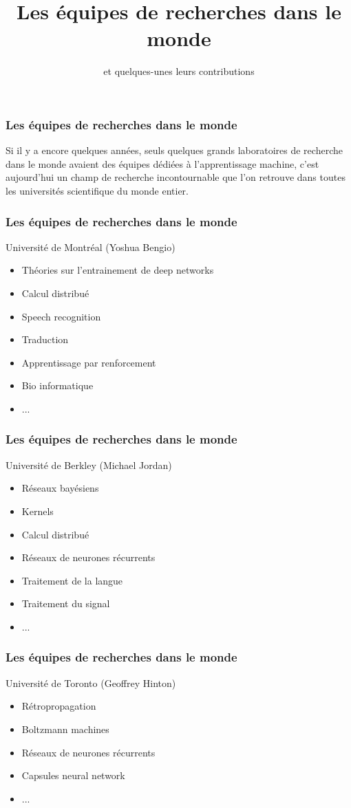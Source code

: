 \documentclass{formation}
\title{Les équipes de recherches dans le monde}
\subtitle{et quelques-unes leurs contributions}
\begin{document}
\begin{frame}
  \frametitle{Les équipes de recherches dans le monde}
  Si il y a encore quelques années, seuls quelques grands laboratoires de recherche dans le monde avaient des équipes dédiées à l'apprentissage machine, c'est aujourd'hui un champ de recherche incontournable que l'on retrouve dans toutes les universités scientifique du monde entier.
\end{frame}

\begin{frame}
  \frametitle{Les équipes de recherches dans le monde}
  Université de Montréal (Yoshua Bengio)
  \begin{itemize}
  \item Théories sur l'entrainement de deep networks
  \item Calcul distribué
  \item Speech recognition
  \item Traduction
  \item Apprentissage par renforcement
  \item Bio informatique
  \item ...
  \end{itemize}
\end{frame}

\begin{frame}
  \frametitle{Les équipes de recherches dans le monde}
  Université de Berkley (Michael Jordan)
  \begin{itemize}
  \item Réseaux bayésiens
  \item Kernels
  \item Calcul distribué
  \item Réseaux de neurones récurrents
  \item Traitement de la langue
  \item Traitement du signal
  \item ...
  \end{itemize}
\end{frame}

\begin{frame}
  \frametitle{Les équipes de recherches dans le monde}
  Université de Toronto (Geoffrey Hinton)
  \begin{itemize}
  \item Rétropropagation
  \item Boltzmann machines
  \item Réseaux de neurones récurrents
  \item Capsules neural network
  \item ...
  \end{itemize}
\end{frame}
\end{document}
